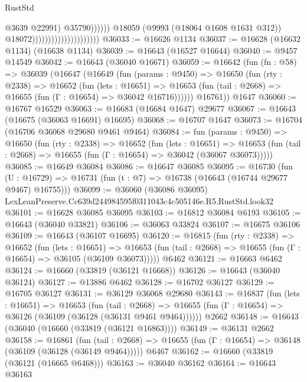 \begin{lexlean}{RustStd}
\begin{coremodule}
                                                            @3639
                                                            @22991)
                                                          @35790))))))
                                              @18059
                                              (@9993 (@18064 @1608 @1631 @312))
                                              @18072)))))))))))))))))))))
@36033 := @16626 @1134
@36037 := @16628 (@16632 @1134) (@16638 @1134)
@36039 := @16643 (@16527 @16644)
@36040 := @9457 @14549
@36042 := @16643 (@36040 @16671)
@36059 := @16642
    (fun (fn : @58) =>
    @36039
      (@16647
        (@16649
          (fun (params : @9450) =>
          @16650
            (fun (rty : @2338) =>
            @16652
              (fun (lets : @16651) =>
              @16653 (fun (tail : @2668) => @16655 (fun (Γ : @16654) => @36042 @16716))))))
        @16761))
    @1647
@36060 := @16767 @16529
@36063 := @16683 (@16684 @1647) @29677
@36067 := @16643 (@16675 (@36063 @16691) @16695)
@36068 := @16707 @1647
@36073 := @16704 (@16706 @36068 @29680 @9461 @9464)
@36084 := fun (params : @9450) =>
  @16650
    (fun (rty : @2338) =>
    @16652
      (fun (lets : @16651) =>
      @16653 (fun (tail : @2668) => @16655 (fun (Γ : @16654) => @36042 (@36067 @36073)))))
@36085 := @16649 @36084
@36086 := @16647 @36085
@36095 := @16730
    (fun (U : @16729) => @16731 (fun (t : @7) => @16738 (@16643 (@16744 @29677 @9467) @16755)))
@36099 := @36060 (@36086 @36095) LexLeanPreserve.Cc639d244984595f0311043c4c505146e.R5.RustStd.look32
@36101 := @16628 @36085 @36095
@36103 := @16812 @36084 @6193
@36105 := @16643 (@36040 @33821)
@36106 := @36063 @33824
@36107 := @16675 @36106
@36109 := @16643 (@36107 @16695)
@36120 := @16815
    (fun (rty : @2338) =>
    @16652
      (fun (lets : @16651) =>
      @16653 (fun (tail : @2668) => @16655 (fun (Γ : @16654) => @36105 (@36109 @36073)))))
    @6462
@36121 := @16663 @6462
@36124 := @16660 (@33819 (@36121 @16668))
@36126 := @16643 (@36040 @36124)
@36127 := @13886 @6462
@36128 := @16702 @36127
@36129 := @16705 @36127
@36131 := @36129 @36068 @29680
@36143 := @16837
    (fun (lets : @16651) =>
    @16653
      (fun (tail : @2668) =>
      @16655 (fun (Γ : @16654) => @36126 (@36109 (@36128 (@36131 @9461 @9464))))))
    @2662
@36148 := @16643 (@36040 (@16660 (@33819 (@36121 @16863))))
@36149 := @36131 @2662
@36158 := @16861
    (fun (tail : @2668) => @16655 (fun (Γ : @16654) => @36148 (@36109 (@36128 (@36149 @9464)))))
    @6467
@36162 := @16660 (@33819 (@36121 (@16665 @6468)))
@36163 := @36040 @36162
@36164 := @16643 @36163

\end{coremodule}
\end{lexlean}
